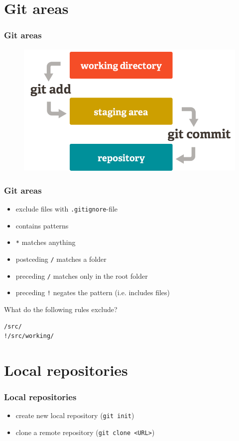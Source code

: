 \documentclass{beamer}
\begin{document}
	\section{Git areas}
	\begin{frame}
		\frametitle{Git areas}
		\begin{figure}[h]
			\centering
			\includegraphics[width=.9\linewidth]{git-areas.png}
			\label{fig1}
		\end{figure}
	\end{frame}

	\begin{frame}
		\frametitle{Git areas}\pause
		\begin{itemize}
			\item exclude files with \lstinline|.gitignore|-file \pause
			\item contains patterns \pause
			\item \lstinline|*| matches anything \pause
			\item postceding \lstinline|/| matches a folder \pause
			\item preceding \lstinline|/| matches only in the root folder \pause
			\item preceding \lstinline|!| negates the pattern (i.e. includes files)
		\end{itemize}
	\end{frame}

	\begin{frame}[fragile]
		\centering What do the following rules exclude?
		\begin{lstlisting}
/src/
!/src/working/
		\end{lstlisting}
	\end{frame}

	\section{Local repositories}
	\begin{frame}
		\frametitle{Local repositories}\pause
		\begin{itemize}
			\item create new local repository (\lstinline|git init|) \pause
			\item clone a remote repository (\lstinline|git clone <URL>|)
		\end{itemize}
	\end{frame}
\end{document}
